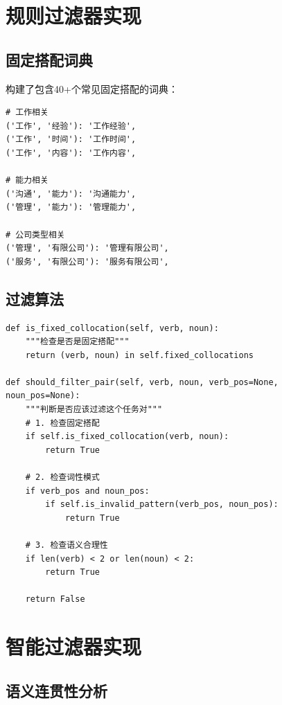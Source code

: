 \documentclass[11pt,a4paper]{article}
\begin{document}
\section{规则过滤器实现}

\subsection{固定搭配词典}

构建了包含40+个常见固定搭配的词典：

\begin{lstlisting}[caption=固定搭配词典示例]
# 工作相关
('工作', '经验'): '工作经验',
('工作', '时间'): '工作时间',
('工作', '内容'): '工作内容',

# 能力相关
('沟通', '能力'): '沟通能力',
('管理', '能力'): '管理能力',

# 公司类型相关
('管理', '有限公司'): '管理有限公司',
('服务', '有限公司'): '服务有限公司',
\end{lstlisting}

\subsection{过滤算法}

\begin{lstlisting}[caption=固定搭配过滤算法]
def is_fixed_collocation(self, verb, noun):
    """检查是否是固定搭配"""
    return (verb, noun) in self.fixed_collocations

def should_filter_pair(self, verb, noun, verb_pos=None, noun_pos=None):
    """判断是否应该过滤这个任务对"""
    # 1. 检查固定搭配
    if self.is_fixed_collocation(verb, noun):
        return True

    # 2. 检查词性模式
    if verb_pos and noun_pos:
        if self.is_invalid_pattern(verb_pos, noun_pos):
            return True

    # 3. 检查语义合理性
    if len(verb) < 2 or len(noun) < 2:
        return True

    return False
\end{lstlisting}

\section{智能过滤器实现}

\subsection{语义连贯性分析}
\end{document}
